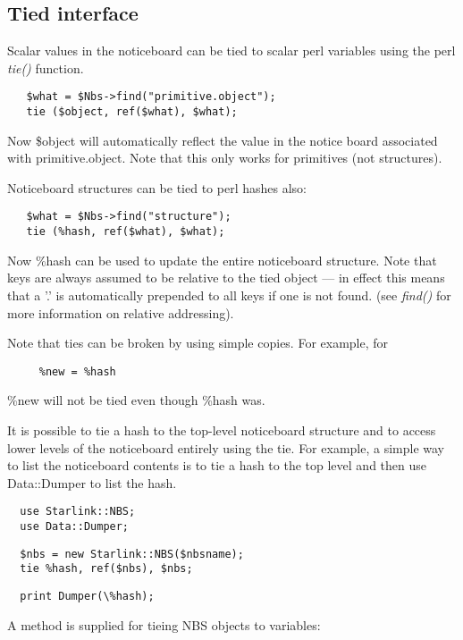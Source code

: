 \documentclass[twoside,11pt]{article}
\renewcommand{\_}{\texttt{\symbol{95}}}
\begin{document}
\subsection{Tied interface}%

Scalar values in the noticeboard can be tied to scalar perl variables
using the perl {\em tie()\/} function.
\begin{verbatim}
   $what = $Nbs->find("primitive.object");
   tie ($object, ref($what), $what);
\end{verbatim}

Now \$object will automatically reflect the value in the notice board
associated with primitive.object. Note that this only works for
primitives (not structures).

Noticeboard structures can be tied to perl hashes also:
\begin{verbatim}
   $what = $Nbs->find("structure");
   tie (%hash, ref($what), $what);
\end{verbatim}

Now \%hash can be used to update the entire noticeboard structure.
Note that keys are always assumed to be relative to the 
tied object --- in effect this means that a '.' is automatically
prepended to all keys if one is not found. (see {\em find()\/}
for more information on relative addressing).

Note that ties can be broken by using simple copies.
For example, for
\begin{verbatim}
     %new = %hash
\end{verbatim}

\%new will not be tied even though \%hash was.

It is possible to tie a hash to the top-level noticeboard structure
and to access lower levels of the noticeboard entirely using the
tie. For example, a simple way to list the noticeboard contents
is to tie a hash to the top level and then use Data::Dumper to
list the hash.
\begin{verbatim}
  use Starlink::NBS;
  use Data::Dumper;
\end{verbatim}
\begin{verbatim}
  $nbs = new Starlink::NBS($nbsname);
  tie %hash, ref($nbs), $nbs;
\end{verbatim}
\begin{verbatim}
  print Dumper(\%hash);  
\end{verbatim}

A method is supplied for tieing NBS objects to variables:
\end{document}
